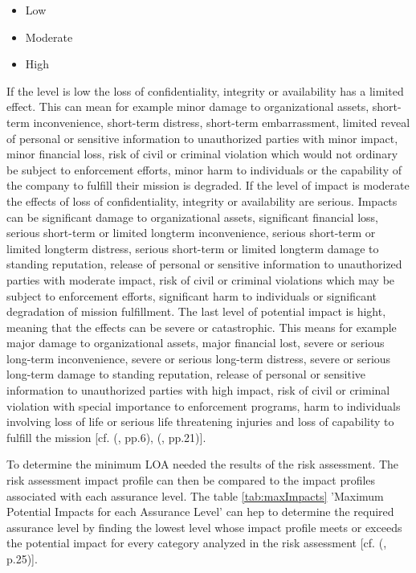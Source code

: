 \begin{itemize}
	\item Low
	\item Moderate
	\item High
\end{itemize}


If the level is low  the loss of confidentiality, integrity or availability has a limited effect. This can mean for example minor damage to organizational assets, short-term inconvenience, short-term distress, short-term embarrassment, limited reveal of personal or sensitive information to unauthorized parties with minor impact, minor financial loss, risk of civil or criminal violation which would not ordinary be subject to enforcement efforts, minor harm to individuals or the capability of the company to fulfill their mission is degraded. If the level of impact is moderate the effects of loss of confidentiality, integrity or availability are serious. Impacts can be significant damage to organizational assets, significant financial loss, serious short-term or limited longterm inconvenience,  serious short-term or limited longterm distress,  serious short-term or limited longterm damage to standing reputation, release of personal or sensitive information to unauthorized parties with moderate impact, risk of civil or criminal violations which may be subject to enforcement efforts, significant harm to individuals or significant degradation of mission fulfillment. The last level of potential impact is hight, meaning that the effects can be severe or catastrophic. This means for example major damage to organizational assets, major financial lost, severe or serious long-term inconvenience, severe or serious long-term distress, severe or serious long-term damage to standing reputation, release of personal or sensitive information to unauthorized parties with high impact, risk of civil or criminal violation with special importance to enforcement programs, harm to individuals involving loss of life or serious life threatening injuries and loss of capability to fulfill the mission [cf. (\cite{NIST:2004:FIOPS}, pp.6), (\cite{NIST:2017:DIG}, pp.21)].


To determine the minimum LOA needed the results of the risk assessment. The risk assessment impact profile can then be compared to the impact profiles associated with each assurance level. The table \ref{tab:maxImpacts} 'Maximum Potential Impacts for each Assurance Level' can hep to determine the required assurance level by finding the lowest level whose impact profile meets or exceeds the potential impact for every category analyzed in the risk assessment [cf. (\cite{NIST:2017:DIG}, p.25)].

